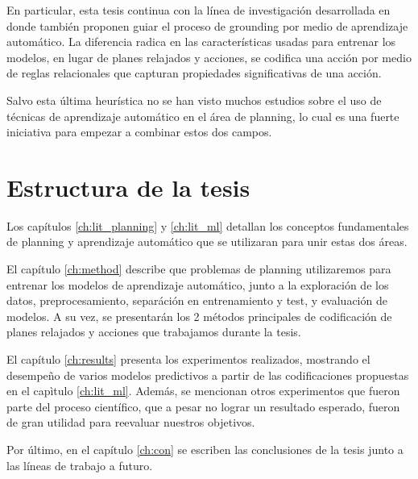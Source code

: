 En particular, esta tesis continua con la línea de investigación desarrollada en
\citep{Gnad_Torralba_Dominguez_Areces_Bustos_2019} donde también proponen guiar
el proceso de grounding por medio de aprendizaje automático. La diferencia
radica en las características usadas para entrenar los modelos, en lugar de
planes relajados y acciones, se codifica una acción por medio de reglas
relacionales que capturan propiedades significativas de una acción.

Salvo esta última heurística no se han visto muchos estudios sobre el uso de
técnicas de aprendizaje automático en el área de planning, lo cual es una fuerte
iniciativa para empezar a combinar estos dos campos.

\section{Estructura de la tesis}

Los capítulos \ref{ch:lit_planning} y \ref{ch:lit_ml} detallan los conceptos
fundamentales de planning y aprendizaje automático que se utilizaran para unir
estas dos áreas.

El capítulo \ref{ch:method} describe que problemas de planning utilizaremos para
entrenar los modelos de aprendizaje automático, junto a la exploración de los
datos, preprocesamiento, separáción en entrenamiento y test, y evaluación de
modelos. A su vez, se presentarán los 2 métodos principales de codificación de
planes relajados y acciones que trabajamos durante la tesis.

El capítulo \ref{ch:results} presenta los experimentos realizados, mostrando el
desempeño de varios modelos predictivos a partir de las codificaciones
propuestas en el capìtulo \ref{ch:lit_ml}. Además, se mencionan otros
experimentos que fueron parte del proceso científico, que a pesar no lograr un
resultado esperado, fueron de gran utilidad para reevaluar nuestros objetivos.

Por último, en el capítulo \ref{ch:con} se escriben las conclusiones de la tesis
junto a las líneas de trabajo a futuro.